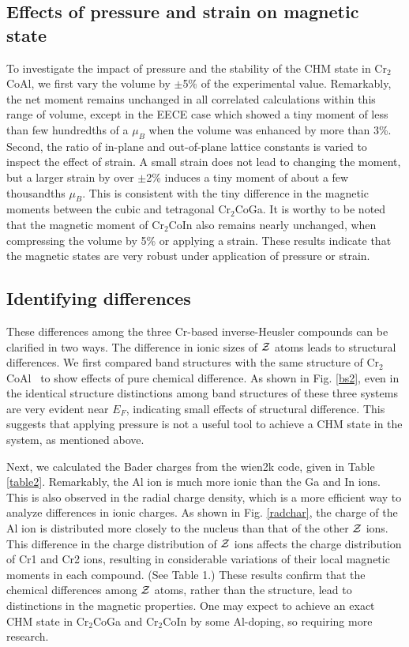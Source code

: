 \documentclass[preprint,5p]{elsarticle}
\newcommand{\cca}{Cr$_2$CoAl}
\begin{document}
\subsection{Effects of pressure and strain on magnetic state}
To investigate the impact of pressure and the stability of the CHM state in \cca, 
we first vary the volume by $\pm$5\% of the experimental value.
Remarkably, the net moment remains unchanged in all correlated calculations within this range of volume,
except in the EECE case which showed a tiny moment of less than few hundredths of a $\mu_B$ 
when the volume was enhanced by more than 3\%.
Second, the ratio of in-plane and out-of-plane lattice constants is varied to inspect
the effect of strain.
A small strain does not lead to changing the moment, 
but a larger strain by over $\pm$2\% induces a tiny moment of about a few thousandths $\mu_B$.
This is consistent with the tiny difference in the magnetic moments between the cubic and tetragonal Cr$_2$CoGa.
It is worthy to be noted that the magnetic moment of Cr$_2$CoIn also remains nearly unchanged,
when compressing the volume by 5\% or applying a strain.
These results indicate that the magnetic states are very robust under application of pressure or strain.



\subsection{Identifying differences}
These differences among the three Cr-based inverse-Heusler compounds
can be clarified in two ways.
The difference in ionic sizes of ${\cal Z}$ atoms leads to structural differences.  
We first compared band structures with the same structure of \cca~ to show effects
of pure chemical difference.
As shown in Fig. \ref{bs2}, even in the identical structure 
distinctions among band structures of these three systems are very evident near $E_F$,
indicating small effects of structural difference.
This suggests that applying pressure is not a useful tool to achieve a CHM state
in the system, as mentioned above.

Next, we calculated the Bader charges from the {\sc wien2k} code, given in Table \ref{table2}.
Remarkably, the Al ion is much more ionic than the Ga and In ions.
This is also observed in the radial charge density, which is  a more efficient way 
to analyze differences in ionic charges.\cite{radchar12}
As shown in Fig. \ref{radchar},
the charge of the Al ion is distributed more closely to the nucleus than that of the other ${\cal Z}$ ions.
This difference in the charge distribution of ${\cal Z}$ ions affects 
the charge distribution of Cr1 and Cr2 ions,
resulting in considerable variations of their local magnetic moments in each compound.
(See Table 1.)
These results confirm that the chemical differences among ${\cal Z}$ atoms, rather than the structure, 
lead to distinctions in the magnetic properties.
One may expect to achieve an exact CHM state in Cr$_2$CoGa and Cr$_2$CoIn by some Al-doping,
so requiring more research.
\end{document}
